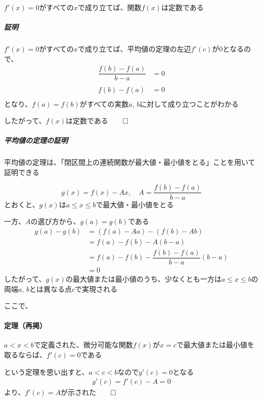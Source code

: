 \documentclass[../book_jiriki_calc]{subfiles}
\begin{document}
$f'(x)=0$がすべての$x$で成り立てば、関数$f(x)$は定数である

\br

\subparagraph{証明}

$f'(x)=0$がすべての$x$で成り立てば、平均値の定理の左辺$f'(c)$が$0$となるので、
\begin{align*}
  \dfrac{f(b) - f(a)}{b - a} & = 0 \\\\
  f(b) - f(a)                & = 0 \\
\end{align*}
となり、$f(a)=f(b)$がすべての実数$a,\,b$に対して成り立つことがわかる

したがって、$f(x)$は定数である$\qed$

\sectionline

\subparagraph{平均値の定理の証明}\quad

平均値の定理は、「閉区間上の連続関数が最大値・最小値をとる」ことを用いて証明できる

\begin{equation*}
  g(x) = f(x) - Ax , \quad A    = \dfrac{f(b) - f(a)}{b - a}
\end{equation*}
とおくと、$g(x)$は$a \leq x \leq b$で最大値・最小値をとる

一方、$A$の選び方から、$g(a)=g(b)$である
\begin{align*}
  g(a) - g(b) & = \left(f(a) - Aa\right) - \left( f(b) - Ab \right) \\
              & = f(a) - f(b) - A(b-a)                              \\
              & = f(a) - f(b) - \dfrac{f(b) - f(a)}{b - a}(b-a)     \\
              & = 0
\end{align*}
したがって、$g(x)$の最大値または最小値のうち、少なくとも一方は$a \leq x \leq b$の両端$a,\,b$とは異なる点$c$で実現される

ここで、

\br

\paragraph{定理（再掲）}

$a < x < b$で定義された、微分可能な関数$f(x)$が$x=c$で最大値または最小値を取るならば、$f'(c)=0$である

\br

という定理を思い出すと、$a < c < b$なので$g'(c) = 0$となる
\begin{align}
  g'(c) = f'(c) - A = 0
\end{align}
より、$f'(c) = A$が示された$\qed$
\end{document}
